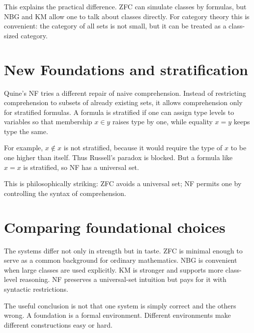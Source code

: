 This explains the practical difference.  ZFC can simulate classes by formulas, but NBG and KM allow one to talk about classes directly.  For category theory this is convenient: the category of all sets is not small, but it can be treated as a class-sized category.

\section{New Foundations and stratification}

Quine's NF tries a different repair of naive comprehension.  Instead of restricting comprehension to subsets of already existing sets, it allows comprehension only for stratified formulas.  A formula is stratified if one can assign type levels to variables so that membership \(x\in y\) raises type by one, while equality \(x=y\) keeps type the same.

For example, \(x\notin x\) is not stratified, because it would require the type of \(x\) to be one higher than itself.  Thus Russell's paradox is blocked.  But a formula like \(x=x\) is stratified, so NF has a universal set.

This is philosophically striking: ZFC avoids a universal set; NF permits one by controlling the syntax of comprehension.

\section{Comparing foundational choices}

The systems differ not only in strength but in taste.  ZFC is minimal enough to serve as a common background for ordinary mathematics.  NBG is convenient when large classes are used explicitly.  KM is stronger and supports more class-level reasoning.  NF preserves a universal-set intuition but pays for it with syntactic restrictions.

The useful conclusion is not that one system is simply correct and the others wrong.  A foundation is a formal environment.  Different environments make different constructions easy or hard.
